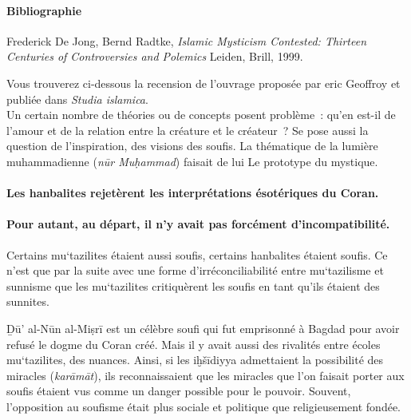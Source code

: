 


\paragraph{Bibliographie}

Frederick De Jong, Bernd Radtke, \emph{Islamic Mysticism Contested:
Thirteen Centuries of Controversies and Polemics} Leiden, Brill, 1999.

Vous trouverez ci-dessous la recension de l'ouvrage proposée par eric
Geoffroy et publiée dans \emph{Studia islamica}. \\


Un certain nombre de théories ou de concepts posent problème~: qu'en
est-il de l'amour et de la relation entre la créature et le créateur~?
Se pose aussi la question de l'inspiration, des visions des soufis. La
thématique de la lumière muhammadienne (\emph{nūr Muḥammad}) faisait de
lui Le prototype du mystique.

\paragraph{Les hanbalites rejetèrent les interprétations ésotériques du Coran.}

\paragraph{Pour autant, au départ, il n'y avait pas forcément d'incompatibilité.
} Certains mu`tazilites étaient aussi soufis, certains hanbalites étaient
soufis. Ce n'est que par la suite avec une forme d'irréconciliabilité
entre mu`tazilisme et sunnisme que les mu`tazilites critiquèrent les
soufis en tant qu'ils étaient des sunnites.

Ḏū' al-Nūn al-Miṣrī est un célèbre soufi qui fut emprisonné à Bagdad
pour avoir refusé le dogme du Coran créé. Mais il y avait aussi des
rivalités entre écoles mu`tazilites, des nuances. Ainsi, si les
iḫšīdiyya admettaient la possibilité des miracles (\emph{karāmāt}), ils
reconnaissaient que les miracles que l'on faisait porter aux soufis
étaient vus comme un danger possible pour le pouvoir. Souvent,
l'opposition au soufisme était plus sociale et politique que
religieusement fondée.

